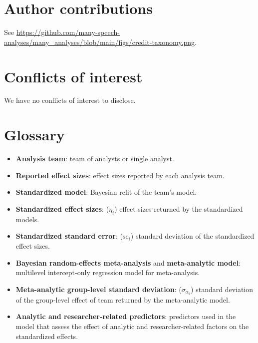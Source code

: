 \documentclass[Review,times,sageh]{sagej}
\providecommand{\tightlist}{\setlength{\itemsep}{0pt}\setlength{\parskip}{0pt}}
\begin{document}
\hypertarget{author-contributions}{%
\section{Author contributions}\label{author-contributions}}

See \url{https://github.com/many-speech-analyses/many_analyses/blob/main/figs/credit-taxonomy.png}.

\hypertarget{conflicts-of-interest}{%
\section{Conflicts of interest}\label{conflicts-of-interest}}

We have no conflicts of interest to disclose.

\appendix

\hypertarget{glossary}{%
\section{Glossary}\label{glossary}}

\begin{itemize}
\tightlist
\item
  \textbf{Analysis team}: team of analysts or single analyst.
\item
  \textbf{Reported effect sizes}: effect sizes reported by each analysis team.
\item
  \textbf{Standardized model}: Bayesian refit of the team's model.
\item
  \textbf{Standardized effect sizes}: (\(\eta_i\)) effect sizes returned by the standardized models.
\item
  \textbf{Standardized standard error}: (\(\text{se}_i\)) standard deviation of the standardized effect sizes.
\item
  \textbf{Bayesian random-effects meta-analysis} and \textbf{meta-analytic model}: multilevel intercept-only regression model for meta-analysis.
\item
  \textbf{Meta-analytic group-level standard deviation}: (\(\sigma_{\alpha_{\text{t}}}\)) standard deviation of the group-level effect of team returned by the meta-analytic model.
\item
  \textbf{Analytic and researcher-related predictors}: predictors used in the model that assess the effect of analytic and researcher-related factors on the standardized effects.
\end{itemize}



\end{document}
